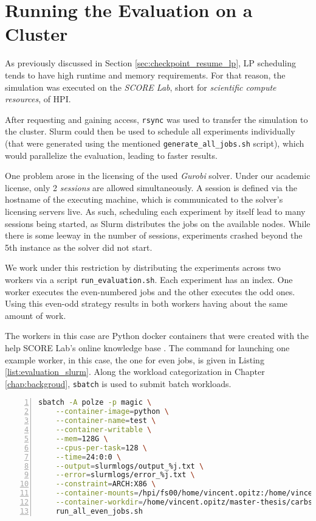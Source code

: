 \section{Running the Evaluation on a Cluster}

As previously discussed in Section \ref{sec:checkpoint_resume_lp}, LP scheduling tends to have high runtime and memory requirements. 
For that reason, the simulation was executed on the \emph{SCORE Lab}, short for \emph{scientific compute resources}, of HPI.

After requesting and gaining access, \verb|rsync| was used to transfer the simulation to the cluster. 
Slurm could then be used to schedule all experiments individually (that were generated using the mentioned \verb|generate_all_jobs.sh| script), which would parallelize the evaluation, leading to faster results.

One problem arose in the licensing of the used \emph{Gurobi} solver. 
Under our academic license, only 2 \emph{sessions} are allowed simultaneously.
A session is defined via the hostname of the executing machine, which is communicated to the solver's licensing servers live.
As such, scheduling each experiment by itself lead to many sessions being started, as Slurm distributes the jobs on the available nodes.
While there is some leeway in the number of sessions, experiments crashed beyond the 5th instance as the solver did not start.

We work under this restriction by distributing the experiments across two workers via a script \verb|run_evaluation.sh|.
Each experiment has an index.
One worker executes the even-numbered jobs and the other executes the odd ones. 
Using this even-odd strategy results in both workers having about the same amount of work.

The workers in this case are Python docker containers that were created with the help SCORE Lab's online knowledge base .
The command for launching one example worker, in this case, the one for even jobs, is given in Listing \ref{list:evaluation_slurm}. 
Along the workload categorization in Chapter \ref{chap:backgroud}, \verb|sbatch| is used to submit batch workloads.

\begin{minipage}{\linewidth}
\begin{lstlisting}[language=bash, frame=single, numbers=left, caption={Submitting the evaluation to SCORE Lab's Slurm}, label={list:evaluation_slurm}, basicstyle=\ttfamily]
sbatch -A polze -p magic \
    --container-image=python \
    --container-name=test \
    --container-writable \
    --mem=128G \
    --cpus-per-task=128 \
    --time=24:0:0 \
    --output=slurmlogs/output_%j.txt \
    --error=slurmlogs/error_%j.txt \
    --constraint=ARCH:X86 \
    --container-mounts=/hpi/fs00/home/vincent.opitz:/home/vincent.opitz \
    --container-workdir=/home/vincent.opitz/master-thesis/carbs \
    run_all_even_jobs.sh
        \end{lstlisting}    
\end{minipage}

